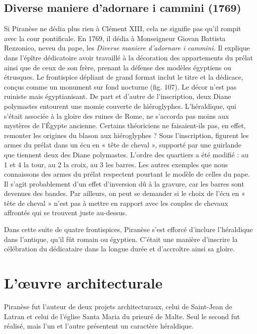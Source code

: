 \documentclass[12pt,twoside,openany]{book}
\begin{document}
\subsection{Diverse maniere d’adornare i cammini (1769)}

Si Piranèse ne dédia plus rien à Clément XIII, cela ne signifie pas qu’il rompit avec la cour pontificale. En 1769, il dédia à Monseigneur Giovan Battista Rezzonico, neveu du pape, les \textit{Diverse maniere d’adornare i cammini. }Il explique dans l’épître dédicatoire avoir travaillé à la décoration des appartements du prélat ainsi que de ceux de son frère, prenant la défense des modèles égyptiens ou étrusques. Le frontispice dépliant de grand format inclut le titre et la dédicace, conçus comme un monument sur fond nocturne (fig. 107). Le décor n’est pas ruiniste mais égyptianisant. De part et d’autre de l’inscription, deux Diane polymastes entourent une momie couverte de hiéroglyphes. L’héraldique, qui s’était associée à la gloire des ruines de Rome, ne s’accorda pas moins aux mystères de l’Égypte ancienne. Certains théoriciens ne faisaient-ils pas, en effet, remonter les origines du blason aux hiéroglyphes ? Sous l’inscription, figurent les armes du prélat dans un écu en « tête de cheval », supporté par une guirlande que tiennent deux des Diane polymastes. L’ordre des quartiers a été modifié : au 1 et 4 la tour, au 2 la croix, au 3 les barres. Les autres exemples que nous connaissons des armes du prélat respectent pourtant le modèle de celles du pape. Il s’agit probablement d’un effet d’inversion dû à la gravure, car les barres sont devenues des bandes. Par ailleurs, on peut se demander si le choix de l’écu en « tête de cheval » n’est pas à mettre en rapport avec les couples de chevaux affrontés qui se trouvent juste au-dessus.

Dans cette suite de quatre frontispices, Piranèse s’est efforcé d’inclure l’héraldique dans l’antique, qu’il fût romain ou égyptien. C’était une manière d’inscrire la célébration du dédicataire dans la longue durée et d’accroître ainsi sa gloire.

\section{L’œuvre architecturale}

Piranèse fut l’auteur de deux projets architecturaux, celui de Saint-Jean de Latran et celui de l’église Santa Maria du prieuré de Malte. Seul le second fut réalisé, mais l’un et l’autre présentent un caractère héraldique.
\end{document}
